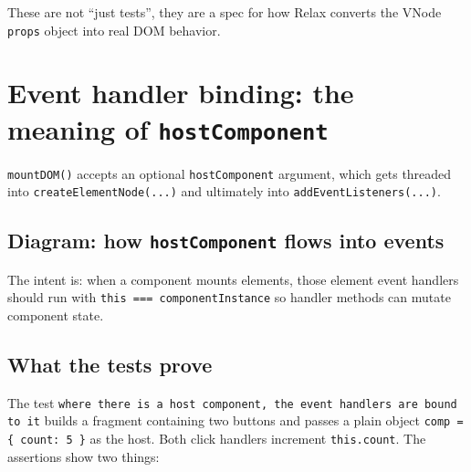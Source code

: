 These are not ``just tests'', they are a spec for how Relax converts the VNode \texttt{props} object into real DOM behavior.

\section{Event handler binding: the meaning of \texttt{hostComponent}}
  	\texttt{mountDOM()} accepts an optional \texttt{hostComponent} argument, which gets threaded into \texttt{createElementNode(...)} and ultimately into \texttt{addEventListeners(...)}.

\subsection*{Diagram: how \texttt{hostComponent} flows into events}

\begin{center}
\end{center}

The intent is: when a component mounts elements, those element event handlers should run with \texttt{this === componentInstance} so handler methods can mutate component state.

\subsection*{What the tests prove}
The test \texttt{where there is a host component, the event handlers are bound to it} builds a fragment containing two buttons and passes a plain object \texttt{comp = \{ count: 5 \}} as the host. Both click handlers increment \texttt{this.count}. The assertions show two things:

